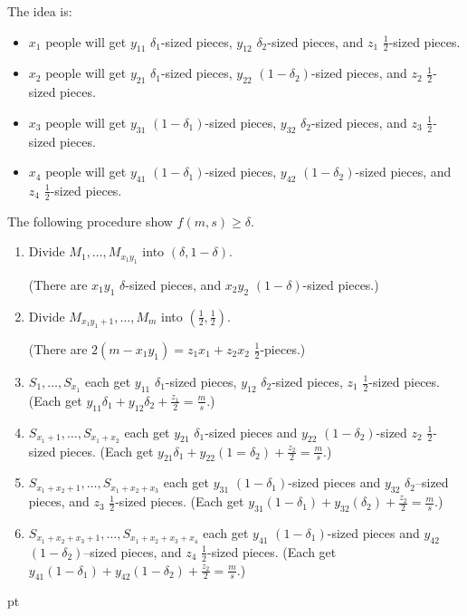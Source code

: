 \documentclass[12pt]{article}
\newenvironment{proof}
    {\pagebreak[1]{\narrower\noindent {\bf Proof:\quad\nopagebreak}}}{\QED}
\newcommand{\yyskip}{\penalty-50\vskip 5pt plus 3pt minus 2pt}
\newcommand{\blackslug}{\hbox{\hskip 1pt
        \vrule width 4pt height 8pt depth 1.5pt\hskip 1pt}}
\newcommand{\QED}{{\penalty10000\parindent 0pt\penalty10000
        \hskip 8 pt\nolinebreak\blackslug\hfill\lower 8.5pt\null}
        \par\yyskip\pagebreak[1]}
\begin{document}
\begin{proof}

The idea is:

\begin{itemize}
\item
$x_1$ people will get 
$y_{11}$ $\delta_1$-sized pieces, $y_{12}$ $\delta_2$-sized pieces, and $z_1$ $\frac{1}{2}$-sized pieces.
\item
$x_2$ people will get 
$y_{21}$ $\delta_1$-sized pieces, $y_{22}$ $(1-\delta_2)$-sized pieces, and $z_2$ $\frac{1}{2}$-sized pieces.
\item
$x_3$ people will get 
$y_{31}$ $(1-\delta_1)$-sized pieces, $y_{32}$ $\delta_2$-sized pieces, and $z_3$ $\frac{1}{2}$-sized pieces.
\item
$x_4$ people will get 
$y_{41}$ $(1-\delta_1)$-sized pieces, $y_{42}$ $(1-\delta_2)$-sized pieces, and $z_4$ $\frac{1}{2}$-sized pieces.
\end{itemize}

The following procedure show $f(m,s) \ge \delta$.

\begin{enumerate}
\item
Divide $M_1,\ldots,M_{x_1y_1}$ into $(\delta,1-\delta)$. 

(There are $x_1y_1$ $\delta$-sized pieces, and $x_2y_2$ $(1-\delta)$-sized pieces.)
\item
Divide $M_{x_1y_1+1},\ldots,M_m$ into $(\frac{1}{2},\frac{1}{2})$.

(There are $2(m-x_1y_1)=z_1x_1+z_2x_2$ $\frac{1}{2}$-pieces.)

\item
$S_1,\ldots,S_{x_1}$ each get $y_{11}$ $\delta_1$-sized pieces, $y_{12}$ $\delta_2$-sized pieces,
$z_1$ $\frac{1}{2}$-sized pieces.  
(Each get $y_{11}\delta_1+y_{12}\delta_2+\frac{z_1}{2}=\frac{m}{s}$.)

\item
$S_{x_1+1},\ldots,S_{x_1+x_2}$ each get $y_{21}$ $\delta_1$-sized pieces and $y_{22}$ $(1-\delta_2)$-sized 
$z_2$ $\frac{1}{2}$-sized pieces.  
(Each get $y_{21}\delta_1+y_{22}(1=\delta_2)+\frac{z_2}{2}=\frac{m}{s}$.)

\item
$S_{x_1+x_2+1},\ldots,S_{x_1+x_2+x_3}$ each get $y_{31}$ $(1-\delta_1)$-sized pieces and $y_{32}$ $\delta_2$--sized pieces, and $z_3$ $\frac{1}{2}$-sized pieces.
(Each get $y_{31}(1-\delta_1)+y_{32}(\delta_2)+\frac{z_2}{2}=\frac{m}{s}$.)

\item
$S_{x_1+x_2+x_3+1},\ldots,S_{x_1+x_2+x_3+x_4}$ each get $y_{41}$ $(1-\delta_1)$-sized pieces and $y_{42}$ 
$(1-\delta_2)$--sized pieces, and $z_4$ $\frac{1}{2}$-sized pieces.  
(Each get $y_{41}(1-\delta_1)+y_{42}(1-\delta_2)+\frac{z_2}{2}=\frac{m}{s}$.)
\end{enumerate}
\end{proof}
\end{document}
